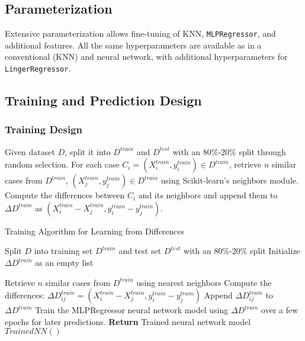 \documentclass[a4paper, 12pt]{report}
\begin{document}
\subsection{Parameterization}
Extensive parameterization allows fine-tuning of KNN, \texttt{MLPRegressor}, and additional features. 
All the same hyperparameters are available as in a conventional (KNN) and neural network, with additional hyperparameters for \texttt{LingerRegressor}.

\subsection{Training and Prediction Design}
\subsubsection{Training Design}
Given dataset $D$, split it into $D^{train}$ and $D^{test}$ with an $80\%$-$20\%$ split through random selection. 
For each case $C_i = (X^{train}_i, y^{train}_i) \in D^{train}$, retrieve $n$ similar cases from $D^{train}$, $(X^{train}_j, y^{train}_j) \in D^{train}$ 
using Scikit-learn's neighbors module. Compute the differences between $C_i$ and its neighbors and append them to $\Delta D^{train}$ as $(X^{train}_i-X^{train}_j, y^{train}_i-y^{train}_j)$.

\begin{algorithm}
    \caption{Training Algorithm for Learning from Differences}
    \label{alg:learning_from_differences_train}
    \begin{algorithmic}[1]
        \State Split $D$ into training set $D^{train}$ and test set $D^{test}$ with an $80\%$-$20\%$ split
        \State Initialize $\Delta D^{train}$ as an empty list
        
            \State Retrieve $n$ similar cases from $D^{train}$ using nearest neighbors
                \State Compute the differences: $\Delta D^{train}_{ij} = (X^{train}_i - X^{train}_j, y^{train}_i - y^{train}_j)$
                \State Append $\Delta D^{train}_{ij}$ to $\Delta D^{train}$
            \EndFor
        \EndFor
        \State Train the MLPRegressor neural network model using $\Delta D^{train}$ over a few epochs for later predictions.
        \State \textbf{Return} Trained neural network model $Trained NN()$
    \end{algorithmic}
\end{algorithm}
\end{document}
